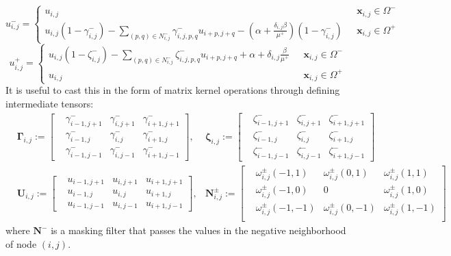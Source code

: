 \documentclass{elsarticle}
\begin{document}
\begin{equation}
	u_{i,j}^-=\begin{cases}
		u_{i,j}                                                                                                                                                 & \text{ $\mathbf{x}_{i,j}\in \Omega^-$} \\
		u_{i,j} (1 - \gamma_{i,j}^- ) - \sum_{(p,q)\in N_{i,j}^-} \gamma_{i,j,p,q}^- u_{i+p,j+q} - (\alpha + \frac{\delta_{i,j}\beta}{\mu^+})(1-\gamma^-_{i,j}) & \text{ $\mathbf{x}_{i,j}\in \Omega^+$}
	\end{cases}
\end{equation}
\begin{equation}
	u_{i,j}^+=\begin{cases}
		u_{i,j}(1 - \zeta^-_{i,j} ) - \sum_{(p,q)\in N_{i,j}^-} \zeta^-_{i,j,p,q}u_{i+p,j+q}  + \alpha + \delta_{i,j}\frac{\beta}{\mu^+} & \text{ $\mathbf{x}_{i,j}\in \Omega^-$} \\
		u_{i,j}                                                                                                                          & \text{ $\mathbf{x}_{i,j}\in \Omega^+$}
	\end{cases}
\end{equation}
It is useful to cast this in the form of matrix kernel operations through defining intermediate tensors:
\begin{align*}
	 & \boldsymbol{\Gamma}_{i,j} := \begin{bmatrix}
		 & \gamma_{i-1,j+1}^- & \gamma^-_{i,j+1} & \gamma^-_{i+1,j+1} \\
		 & \gamma_{i-1,j}^-   & \gamma^-_{i,j}   & \gamma^-_{i+1,j}   \\
		 & \gamma_{i-1,j-1}^- & \gamma^-_{i,j-1} & \gamma^-_{i+1,j-1}
	\end{bmatrix}, & \boldsymbol{\zeta}_{i,j} := \begin{bmatrix}
		 & \zeta^-_{i-1,j+1} & \zeta^-_{i,j+1} & \zeta^-_{i+1,j+1} \\
		 & \zeta^-_{i-1,j}   & \zeta^-_{i,j}   & \zeta^-_{i+1,j}   \\
		 & \zeta^-_{i-1,j-1} & \zeta^-_{i,j-1} & \zeta^-_{i+1,j-1}
	\end{bmatrix} \\
	 & \mathbf{U}_{i,j} := \begin{bmatrix}
		 & u_{i-1,j+1} & u_{i,j+1} & u_{i+1, j+1} \\
		 & u_{i-1,j}   & u_{i,j}   & u_{i+1, j}   \\
		 & u_{i-1,j-1} & u_{i,j-1} & u_{i+1, j-1}
	\end{bmatrix},          & \mathbf{N}^\pm_{i,j} :=\begin{bmatrix}
		 & \omega_{i,j}^\pm(-1,1)  & \omega_{i,j}^\pm(0,1)  & \omega_{i,j}^\pm(1,1)  \\
		 & \omega_{i,j}^\pm(-1,0)  & 0                      & \omega_{i,j}^\pm(1,0)  \\
		 & \omega_{i,j}^\pm(-1,-1) & \omega_{i,j}^\pm(0,-1) & \omega_{i,j}^\pm(1,-1) \\
	\end{bmatrix}
\end{align*}
where $\mathbf{N^-}$ is a masking filter that passes the values in the negative neighborhood of node $(i,j)$.
\end{document}
